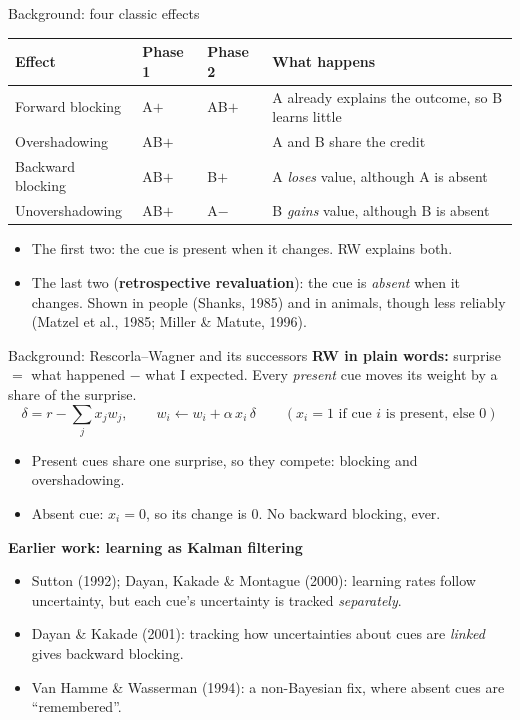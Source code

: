 \documentclass[aspectratio=169,11pt]{beamer}
\begin{document}
\begin{frame}{Background: four classic effects}
\centering
\small
\begin{tabular}{llll}
\toprule
Effect & Phase 1 & Phase 2 & What happens\\
\midrule
Forward blocking & A$+$ & AB$+$ & A already explains the outcome, so B learns little\\
Overshadowing & AB$+$ & & A and B share the credit\\
\alert{Backward blocking} & AB$+$ & B$+$ & A \emph{loses} value, although A is absent\\
\alert{Unovershadowing} & AB$+$ & A$-$ & B \emph{gains} value, although B is absent\\
\bottomrule
\end{tabular}
\vspace{0.8em}
\begin{itemize}\small
\item The first two: the cue is present when it changes. RW explains both.
\item The last two (\textbf{retrospective revaluation}): the cue is \emph{absent} when it changes.
Shown in people (Shanks, 1985) and in animals, though less reliably (Matzel et al., 1985; Miller \& Matute, 1996).
\end{itemize}
\end{frame}

\begin{frame}{Background: Rescorla--Wagner and its successors}
\textbf{RW in plain words:} surprise $=$ what happened $-$ what I expected.
Every \emph{present} cue moves its weight by a share of the surprise.
\[
\delta = r - \textstyle\sum_j x_j w_j, \qquad w_i \leftarrow w_i + \alpha\, x_i\,\delta
\qquad (x_i = 1 \text{ if cue } i \text{ is present, else } 0)
\]
\begin{itemize}\small
\item Present cues share one surprise, so they compete: blocking and overshadowing.
\item Absent cue: $x_i = 0$, so its change is 0. \alert{No backward blocking, ever.}
\end{itemize}
\vspace{0.2em}
\textbf{Earlier work: learning as Kalman filtering}
\begin{itemize}\footnotesize
\item Sutton (1992); Dayan, Kakade \& Montague (2000): learning rates follow uncertainty, but each cue's uncertainty is tracked \emph{separately}.
\item Dayan \& Kakade (2001): tracking how uncertainties about cues are \emph{linked} gives backward blocking.
\item Van Hamme \& Wasserman (1994): a non-Bayesian fix, where absent cues are ``remembered''.
\end{itemize}
\end{frame}
\end{document}

